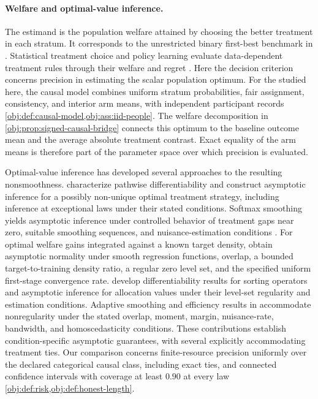\documentclass[11pt]{article}
\begin{document}
\paragraph{Welfare and optimal-value inference.}
The estimand is the population welfare attained by choosing the better treatment in each stratum. It corresponds to the unrestricted binary first-best benchmark in \citet[Section~2, equations~(3)--(7)]{Cerulli2026OptimalPolicy}. Statistical treatment choice and policy learning evaluate data-dependent treatment rules through their welfare and regret \citep{Manski2004,Kitagawa2018,Athey2021}. Here the decision criterion concerns precision in estimating the scalar population optimum. For the  studied here, the causal model combines uniform stratum probabilities, fair assignment, consistency, and interior arm means, with independent participant records \cref{obj:def:causal-model,obj:ass:iid-people}. The welfare decomposition in \cref{obj:prop:signed-causal-bridge} connects this optimum to the baseline outcome mean and the average absolute treatment contrast. Exact equality of the arm means is therefore part of the parameter space over which precision is evaluated.

Optimal-value inference has developed several approaches to the resulting nonsmoothness. \citet{LuedtkeVanDerLaan2016OptimalValue} characterize pathwise differentiability and construct asymptotic inference for a possibly non-unique optimal treatment strategy, including inference at exceptional laws under their stated conditions. Softmax smoothing yields asymptotic inference under controlled behavior of treatment gaps near zero, suitable smoothing sequences, and nuisance-estimation conditions \citep[Theorem~3.3]{WhitehouseChenAusternSyrgkanis2026Softmax}. For optimal welfare gains integrated against a known target density, \citet[Theorem~1, Assumptions~1, 2(b)(c), and~3]{Chen2025} obtain asymptotic normality under smooth regression functions, overlap, a bounded target-to-training density ratio, a regular zero level set, and the specified uniform first-stage convergence rate. \citet[Sections~3.2 and~4]{Feng2026} develop differentiability results for sorting operators and asymptotic inference for allocation values under their level-set regularity and estimation conditions. Adaptive smoothing and efficiency results in \citet[Theorems~2.2 and~3.1, Assumptions~1--8]{Xu2026} accommodate nonregularity under the stated overlap, moment, margin, nuisance-rate, bandwidth, and homoscedasticity conditions. These contributions establish condition-specific asymptotic guarantees, with several explicitly accommodating treatment ties. Our comparison concerns finite-resource precision uniformly over the declared categorical causal class, including exact ties, and connected confidence intervals with coverage at least \(0.90\) at every law \cref{obj:def:risk,obj:def:honest-length}.
\end{document}
